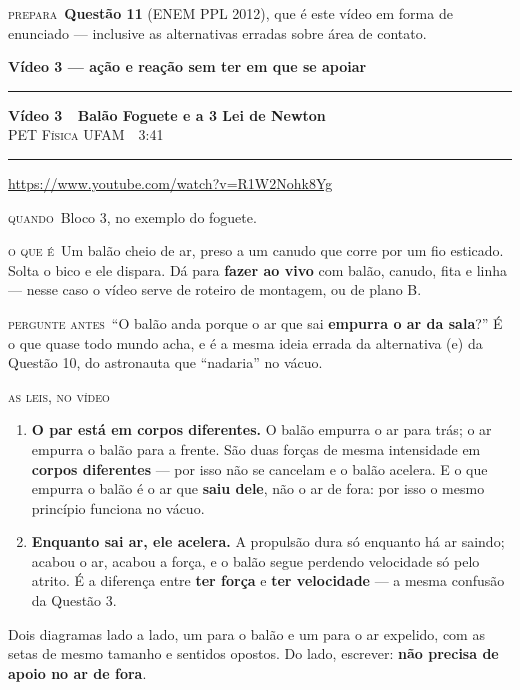 \documentclass[11pt,a4paper]{article}
\newcommand{\secao}[1]{%
  \needspace{7\baselineskip}
  \vspace{1.8em}
  {\Large\bfseries #1}\\[-0.55em]
  {\color{black!30}\rule{\linewidth}{0.5pt}}
  \par\nobreak\smallskip
}
\newcommand{\video}[5]{%
  \needspace{8\baselineskip}
  \par\addvspace{1.4em}
  {\large\bfseries\color{vinho}V\'ideo #1 \,\textemdash\, #2}\\[0.1em]
  {\small\scshape\color{grafite}#3 \,\textperiodcentered\, #4}\\[-0.5em]
  {\color{black!25}\rule{\linewidth}{0.4pt}}
  \par\nobreak\smallskip
  {\small\url{#5}}
  \par\smallskip
}
\newcommand{\campo}[2]{%
  \par{\small\scshape\color{vinho}#1}\ #2\par}
\begin{document}
\campo{prepara}{\textbf{Quest\~ao 11} (ENEM PPL 2012), que \'e este
v\'ideo em forma de enunciado --- inclusive as alternativas erradas
sobre \'area de contato.}

\secao{V\'ideo 3 --- a\c{c}\~ao e rea\c{c}\~ao sem ter em que se apoiar}

\video{3}{Bal\~ao Foguete e a 3\textordfeminine{} Lei de Newton}{PET
F\'isica UFAM}{3:41}{https://www.youtube.com/watch?v=R1W2Nohk8Yg}

\campo{quando}{Bloco 3, no exemplo do foguete.}

\campo{o que \'e}{Um bal\~ao cheio de ar, preso a um canudo que corre por
um fio esticado. Solta o bico e ele dispara. D\'a para \textbf{fazer ao
vivo} com bal\~ao, canudo, fita e linha --- nesse caso o v\'ideo serve
de roteiro de montagem, ou de plano B.}

\campo{pergunte antes}{``O bal\~ao anda porque o ar que sai
\textbf{empurra o ar da sala}?'' \'E o que quase todo mundo acha, e \'e
a mesma ideia errada da alternativa (e) da Quest\~ao 10, do astronauta
que ``nadaria'' no v\'acuo.}

\campo{as leis, no v\'ideo}{}

\begin{enumerate}[leftmargin=2.4em, itemsep=0.55em]
  \item[\textbf{3\textordfeminine{}}] \textbf{O par est\'a em corpos
        diferentes.} O bal\~ao empurra o ar para tr\'as; o ar empurra o
        bal\~ao para a frente. S\~ao duas for\c{c}as de mesma
        intensidade em \textbf{corpos diferentes} --- por isso n\~ao se
        cancelam e o bal\~ao acelera. E o que empurra o bal\~ao \'e o ar
        que \textbf{saiu dele}, n\~ao o ar de fora: por isso o mesmo
        princ\'ipio funciona no v\'acuo.

  \item[\textbf{2\textordfeminine{}}] \textbf{Enquanto sai ar, ele
        acelera.} A propuls\~ao dura s\'o enquanto h\'a ar saindo;
        acabou o ar, acabou a for\c{c}a, e o bal\~ao segue perdendo
        velocidade s\'o pelo atrito. \'E a diferen\c{c}a entre
        \textbf{ter for\c{c}a} e \textbf{ter velocidade} --- a mesma
        confus\~ao da Quest\~ao 3.
\end{enumerate}

\begin{quadro}
Dois diagramas lado a lado, um para o bal\~ao e um para o ar expelido,
com as setas de mesmo tamanho e sentidos opostos. Do lado, escrever:
\textbf{n\~ao precisa de apoio no ar de fora}.
\end{quadro}
\end{document}
